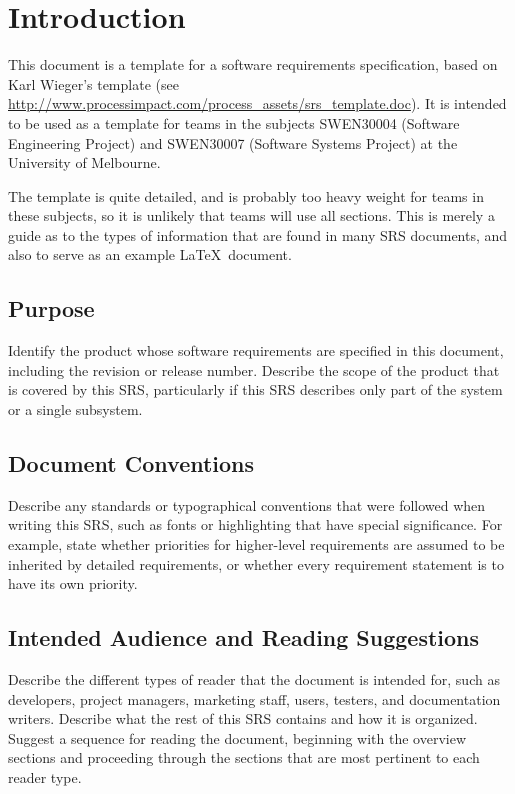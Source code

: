 
\chapter{Introduction}

This document is a template for a software requirements specification,
based on Karl Wieger's template (see
\url{http://www.processimpact.com/process_assets/srs_template.doc}). It
is intended to be used as a template for teams in the subjects
SWEN30004 (Software Engineering Project) and SWEN30007 (Software
Systems Project) at the University of Melbourne.

The template is quite detailed, and is probably too heavy weight for
teams in these subjects, so it is unlikely that teams will use all
sections. This is merely a guide as to the types of information that
are found in many SRS documents, and also to serve as an example
\LaTeX\ document.

\section{Purpose}

Identify the product whose software requirements are specified in this
document, including the revision or release number. Describe the scope
of the product that is covered by this SRS, particularly if this SRS
describes only part of the system or a single subsystem.



\section{Document Conventions}

Describe any standards or typographical conventions that were followed
when writing this SRS, such as fonts or highlighting that have special
significance. For example, state whether priorities  for higher-level
requirements are assumed to be inherited by detailed requirements, or
whether every requirement statement is to have its own priority.

\section{Intended Audience and Reading Suggestions}

Describe the different types of reader that the document is intended
for, such as developers, project managers, marketing staff, users,
testers, and documentation writers. Describe what the rest of this SRS
contains and how it is organized. Suggest a sequence for reading the
document, beginning with the overview sections and proceeding through
the sections that are most pertinent to each reader type.


